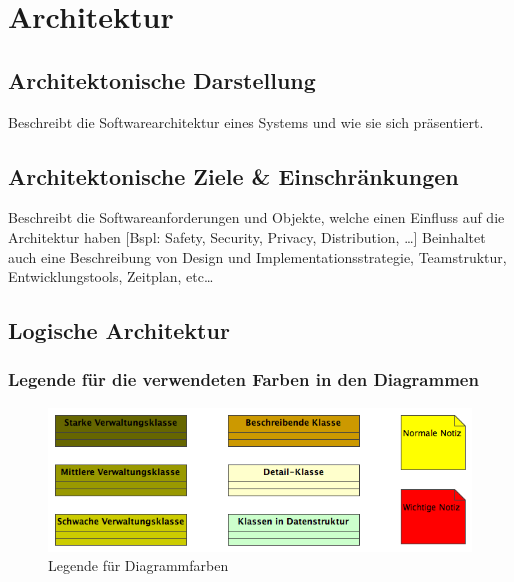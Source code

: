 \documentclass[a4paper,12pt,halfparskip,DIV14]{scrartcl}
\begin{document}


\section{Architektur} %
\label{sec:architektur}
\subsection{Architektonische Darstellung } %
\label{sub:architektonische_darstellung_}
Beschreibt die Softwarearchitektur eines Systems und wie sie sich präsentiert.

\subsection{Architektonische Ziele \& Einschränkungen} %
\label{sub:architektonische_ziele_einschränkungen}
Beschreibt die Softwareanforderungen und Objekte, welche einen Einfluss auf die Architektur haben [Bspl: Safety, Security, Privacy, Distribution, …] Beinhaltet auch eine Beschreibung von Design und Implementationsstrategie, Teamstruktur, Entwicklungstools, Zeitplan, etc…

\newpage
\subsection{Logische Architektur} %
\label{sub:logische_architektur}

\subsubsection{Legende für die verwendeten Farben in den Diagrammen}\label{ssub:legende} %
\begin{figure}
	[htp] \centering 
	\includegraphics[width=1\textwidth]{legende.png} \caption{Legende für Diagrammfarben}\label{fig:legende.png} 
\end{figure}
\end{document}
